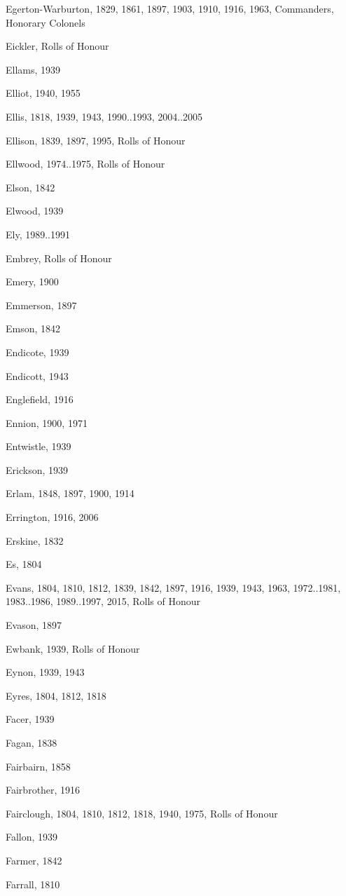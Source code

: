 {\begin{theindex}
\item Egerton-Warburton, 1829, 1861, 1897, 1903, 1910, 1916, 1963, Commanders, Honorary Colonels
\item Eickler, Rolls of Honour
\item Ellams, 1939
\item Elliot, 1940, 1955
\item Ellis, 1818, 1939, 1943, 1990..1993, 2004..2005
\item Ellison, 1839, 1897, 1995, Rolls of Honour
\item Ellwood, 1974..1975, Rolls of Honour
\item Elson, 1842
\item Elwood, 1939
\item Ely, 1989..1991
\item Embrey, Rolls of Honour
\item Emery, 1900
\item Emmerson, 1897
\item Emson, 1842
\item Endicote, 1939
\item Endicott, 1943
\item Englefield, 1916
\item Ennion, 1900, 1971
\item Entwistle, 1939
\item Erickson, 1939
\item Erlam, 1848, 1897, 1900, 1914
\item Errington, 1916, 2006
\item Erskine, 1832
\item Es, 1804
\item Evans, 1804, 1810, 1812, 1839, 1842, 1897, 1916, 1939, 1943, 1963, 1972..1981, 1983..1986, 1989..1997, 2015, Rolls of Honour
\item Evason, 1897
\item Ewbank, 1939, Rolls of Honour
\item Eynon, 1939, 1943
\item Eyres, 1804, 1812, 1818
\item Facer, 1939
\item Fagan, 1838
\item Fairbairn, 1858
\item Fairbrother, 1916
\item Fairclough, 1804, 1810, 1812, 1818, 1940, 1975, Rolls of Honour
\item Fallon, 1939
\item Farmer, 1842
\item Farrall, 1810

\end{theindex}}
